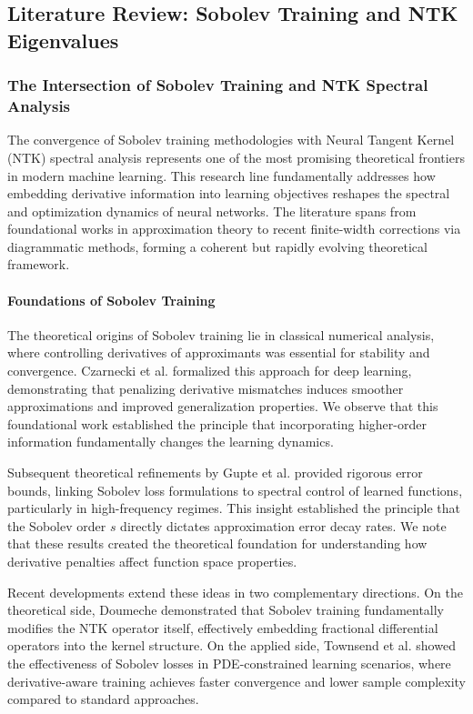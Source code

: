\documentclass[a4paper]{article}
\theoremstyle{plain}
\theoremstyle{definition}
\theoremstyle{remark}
\begin{document}
\subsection{Literature Review: Sobolev Training and NTK Eigenvalues}

\subsubsection{The Intersection of Sobolev Training and NTK Spectral Analysis}

The convergence of Sobolev training methodologies with Neural Tangent Kernel (NTK) spectral analysis represents one of the most promising theoretical frontiers in modern machine learning. This research line fundamentally addresses how embedding derivative information into learning objectives reshapes the spectral and optimization dynamics of neural networks. The literature spans from foundational works in approximation theory to recent finite-width corrections via diagrammatic methods, forming a coherent but rapidly evolving theoretical framework.

\paragraph{Foundations of Sobolev Training}

The theoretical origins of Sobolev training lie in classical numerical analysis, where controlling derivatives of approximants was essential for stability and convergence. Czarnecki et al. \cite{czarnecki2017sobolev} formalized this approach for deep learning, demonstrating that penalizing derivative mismatches induces smoother approximations and improved generalization properties. We observe that this foundational work established the principle that incorporating higher-order information fundamentally changes the learning dynamics.

Subsequent theoretical refinements by Gupte et al. \cite{gupte2022sobolev_loss} provided rigorous error bounds, linking Sobolev loss formulations to spectral control of learned functions, particularly in high-frequency regimes. This insight established the principle that the Sobolev order $s$ directly dictates approximation error decay rates. We note that these results created the theoretical foundation for understanding how derivative penalties affect function space properties.

Recent developments extend these ideas in two complementary directions. On the theoretical side, Doumeche \cite{doumeche2023sobolev} demonstrated that Sobolev training fundamentally modifies the NTK operator itself, effectively embedding fractional differential operators into the kernel structure. On the applied side, Townsend et al. \cite{townsend2022sobolev} showed the effectiveness of Sobolev losses in PDE-constrained learning scenarios, where derivative-aware training achieves faster convergence and lower sample complexity compared to standard approaches.
\end{document}
